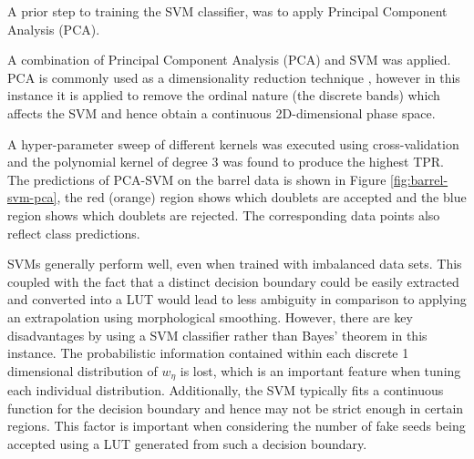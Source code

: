 A prior step to training the SVM classifier, was to apply Principal Component Analysis (PCA).

A combination of Principal Component Analysis (PCA) and SVM was applied. PCA is commonly used as a dimensionality reduction technique \cite{pca}, however in this instance it is applied to remove the ordinal nature (the discrete bands) which affects the SVM and hence obtain a continuous 2D-dimensional phase space. 
    
A hyper-parameter sweep of different kernels was executed using cross-validation and the polynomial kernel of degree 3 was found to produce the highest TPR. The predictions of PCA-SVM on the barrel data is shown in Figure \ref{fig:barrel-svm-pca}, the red (orange) region shows which doublets are accepted and the blue region shows which doublets are rejected. The corresponding data points also reflect class predictions. 

SVMs generally perform well, even when trained with imbalanced data sets. This coupled with the fact that a distinct decision boundary could be easily extracted and converted into a LUT would lead to less ambiguity in comparison to applying an extrapolation using morphological smoothing. However, there are key disadvantages by using a SVM classifier rather than Bayes' theorem in this instance. The probabilistic information contained within each discrete 1 dimensional distribution of $w_{\eta}$ is lost, which is an important feature when tuning each individual distribution. Additionally, the SVM typically fits a continuous function for the decision boundary and hence may not be strict enough in certain regions. This factor is important when considering the number of fake seeds being accepted using a LUT generated from such a decision boundary. 


